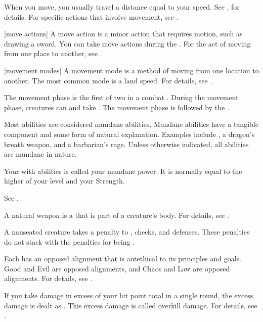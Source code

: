  When you move, you usually travel a distance equal to your speed.
See , for details.
For specific actions that involve movement, see .

[move actions] A move action is a minor action that requires motion, such as drawing a sword.
You can take move actions during the .
For the act of moving from one place to another, see .

[movement modes] A movement mode is a method of moving from one location to another.
The most common mode is a land speed.
For details, see .

 The movement phase is the first of two  in a combat .
During the movement phase, creatures can  and take .
The movement phase is followed by the .

 Most abilities are considered mundane abilities.
Mundane abilities have a tangible component and some form of natural explanation.
Examples include , a dragon's breath weapon, and a barbarian's rage.
Unless otherwise indicated, all abilities are mundane in nature.

 Your  with  abilities is called your mundane power.
It is normally equal to the higher of your level and your Strength.

 See .

 A natural weapon is a  that is part of a creature's body.
For details, see .

 A nauseated creature takes a  penalty to , checks, and defenses.
These penalties do not stack with the penalties for being \sickened.

 Each  has an opposed alignment that is antethical to its principles and goals.
Good and Evil are opposed alignments, and Chaos and Law are opposed alignments.
For details, see .

 If you take damage in excess of your  hit point total in a single round, the excess damage is dealt as .
This excess damage is called overkill damage.
For details, see .

